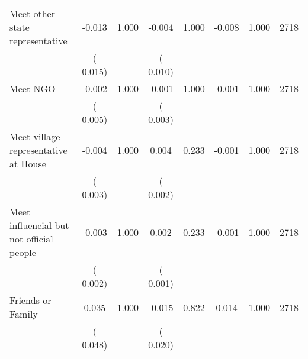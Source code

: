 \begin{tabular}{l*{7}{c}}
 Meet other state representative       &             -0.013       &        1.000  &             -0.004       &        1.000  &             -0.008       &              1.000 &  2718 \\ 
                       &       (       0.015)             &                               &       (       0.010)                     &                               &                                               &                                &                      \\ 

 Meet NGO       &             -0.002       &        1.000  &             -0.001       &        1.000  &             -0.001       &              1.000 &  2718 \\ 
                       &       (       0.005)             &                               &       (       0.003)                     &                               &                                               &                                &                      \\ 

 Meet village representative at House       &             -0.004       &        1.000  &              0.004       &        0.233  &             -0.001       &              1.000 &  2718 \\ 
                       &       (       0.003)             &                               &       (       0.002)                     &                               &                                               &                                &                      \\ 

 Meet influencial but not official people       &             -0.003       &        1.000  &              0.002       &        0.233  &             -0.001       &              1.000 &  2718 \\ 
                       &       (       0.002)             &                               &       (       0.001)                     &                               &                                               &                                &                      \\ 

 Friends or Family       &              0.035       &        1.000  &             -0.015       &        0.822  &              0.014       &              1.000 &  2718 \\ 
                       &       (       0.048)             &                               &       (       0.020)                     &                               &                                               &                                &                      \\ 

\hline \end{tabular}